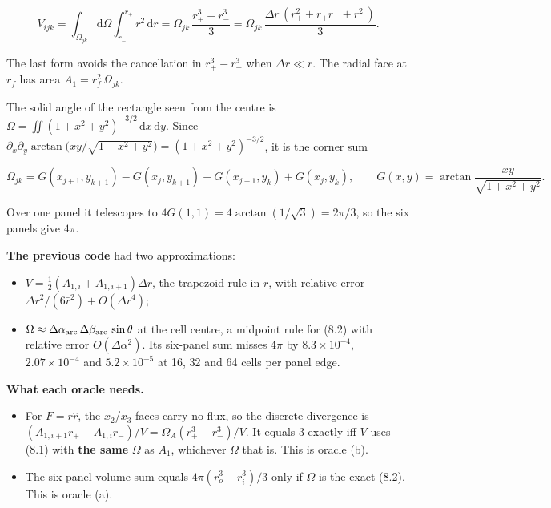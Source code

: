 \documentclass[11pt,a4paper]{article}
\begin{document}
\begin{equation*}
V_{ijk} = \int_{\Omega_{jk}}\!\mathrm{d}\Omega\int_{r_-}^{r_+} r^2\,\mathrm{d}r
        = \Omega_{jk}\,\frac{r_+^3-r_-^3}{3}
        = \Omega_{jk}\,\frac{\Delta r\,(r_+^2+r_+r_-+r_-^2)}{3}. \tag{8.1}
\end{equation*}

The last form avoids the cancellation in $r_+^3-r_-^3$ when $\Delta r\ll r$. The radial face at
$r_f$ has area $A_1 = r_f^2\,\Omega_{jk}$.

The solid angle of the rectangle seen from the centre is
$\Omega=\iint (1+x^2+y^2)^{-3/2}\,\mathrm{d}x\,\mathrm{d}y$. Since
$\partial_x\partial_y\arctan\!\big(xy/\sqrt{1+x^2+y^2}\big) = (1+x^2+y^2)^{-3/2}$, it is the corner sum

\begin{equation*}
\Omega_{jk} = G(x_{j+1},y_{k+1}) - G(x_j,y_{k+1}) - G(x_{j+1},y_k) + G(x_j,y_k),\qquad
G(x,y)=\arctan\frac{xy}{\sqrt{1+x^2+y^2}}. \tag{8.2}
\end{equation*}

Over one panel it telescopes to $4G(1,1)=4\arctan(1/\sqrt3)=2\pi/3$, so the six panels give $4\pi$.

\textbf{The previous code} had two approximations:
\begin{itemize}
\item $V = \tfrac12(A_{1,i}+A_{1,i+1})\Delta r$, the trapezoid rule in $r$, with relative error
  $\Delta r^2/(6\bar r^2)+O(\Delta r^4)$;
\item $\Omega\approx\Delta\alpha_{\rm arc}\,\Delta\beta_{\rm arc}\,\sin\theta$ at the cell centre, a
  midpoint rule for (8.2) with relative error $O(\Delta\alpha^2)$. Its six-panel sum misses $4\pi$
  by $8.3\times10^{-4}$, $2.07\times10^{-4}$ and $5.2\times10^{-5}$ at 16, 32 and 64 cells per panel edge.
\end{itemize}

\textbf{What each oracle needs.}
\begin{itemize}
\item For $F=r\hat r$, the $x_2$/$x_3$ faces carry no flux, so the discrete divergence is
  $(A_{1,i+1}r_+ - A_{1,i}r_-)/V = \Omega_A(r_+^3-r_-^3)/V$. It equals 3 exactly iff $V$ uses
  (8.1) with \textbf{the same} $\Omega$ as $A_1$, whichever $\Omega$ that is. This is oracle (b).
\item The six-panel volume sum equals $4\pi(r_o^3-r_i^3)/3$ only if $\Omega$ is the exact (8.2). This
  is oracle (a).
\end{itemize}
\end{document}
